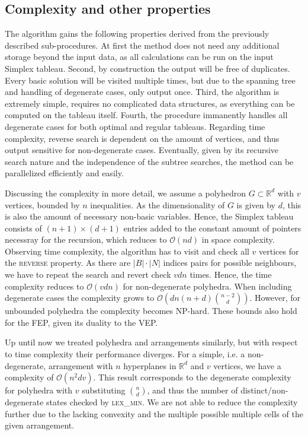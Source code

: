 \documentclass[a4paper, 11pt]{article}
\begin{document}
\subsection{Complexity and other properties}
The algorithm gains the following properties derived from the previously described sub-procedures. At first the method does not need any additional storage beyond the input data, as all calculations can be run on the input Simplex tableau. Second, by construction the output will be free of duplicates. Every basic solution will be visited multiple times, but due to the spanning tree and handling of degenerate cases, only output once. Third, the algorithm is extremely simple, requires no complicated data structures, as everything can be computed on the tableau itself. Fourth, the procedure immanently handles all degenerate cases for both optimal and regular tableaus. Regarding time complexity, reverse search is dependent on the amount of vertices, and thus output sensitive for non-degenerate cases.
Eventually, given by its recursive search nature and the independence of the subtree searches, the method can be parallelized efficiently and easily.\medskip

Discussing the complexity in more detail, we assume a polyhedron $G\subset\mathbb{R}^d$ with $v$ vertices, bounded by $n$ inequalities. As the dimensionality of $G$ is given by $d$, this is also the amount of necessary non-basic variables. Hence, the Simplex tableau consists of $(n+1)\times (d+1)$ entries added to the constant amount of pointers necessray for the recursion, which reduces to $\mathcal{O}(nd)$ in space complexity. \medskip
Observing time complexity, the algorithm has to visit and check all $v$ vertices for the \textsc{reverse} property. As there are $|B|\cdot|N|$ indices pairs for  possible neighbours, we have to repeat the search and revert check $vdn$ times. Hence, the time complexity reduces to $\mathcal{O}(vdn)$ for non-degenerate polyhedra. When including degenerate cases the complexity grows to $\mathcal{O}\left( dn(n+d){n-2\choose d} \right)$. However, for unbounded polyhedra the complexity becomes NP-hard. These bounds also hold for the FEP, given its duality to the VEP.\medskip

Up until now we treated polyhedra and arrangements similarly, but with respect to time complexity their performance diverges. For a simple, i.e. a non-degenerate, arrangement with $n$ hyperplanes in $\mathbb{R}^d$ and $v$ vertices, we have a complexity of $\mathcal{O}(n^2dv)$. This result corresponds to the degenerate complexity for polyhedra with $v$ substituting ${n\choose d}$, and thus the number of distinct/non-degenerate states checked by \textsc{lex\_min}. We are not able to reduce the complexity further due to the lacking convexity and the multiple possible multiple cells of the given arrangement.
\end{document}
